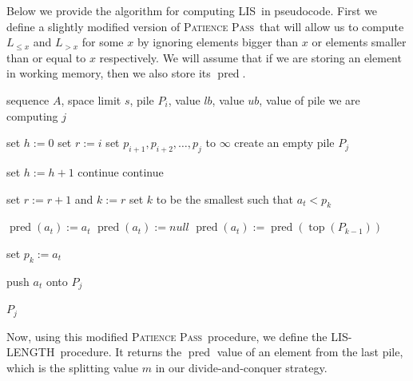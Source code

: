 \documentclass[lic, english, shortabstract]{iithesis}
\theoremstyle{plain}
\newcommand{\Lis}{\textsc{LIS}}
\newcommand{\LisLen}{\textsc{LIS-LENGTH}}
\newcommand{\Ppass}{\textsc{Patience Pass}}
\theoremstyle{definition}
\begin{document}
Below we provide the algorithm for computing \Lis\ in pseudocode.
First we define a slightly modified version of \Ppass\ that will allow us to compute $L_{\leq x}$ and $L_{> x}$ for some $x$ by ignoring elements bigger than $x$ or elements smaller than or equal to $x$ respectively.
We will assume that if we are storing an element in working memory, then we also store its $\operatorname{pred}$.
\begin{algorithm}
    \caption{\Ppass\ -- the second pass through an array, computing $P_j$}
    \label{alg:ppas-mod}
    \begin{algorithmic}[1]
        \Require sequence $A$, space limit $s$, pile $P_i$, value $lb$, value $ub$, value of pile we are computing $j$

        \State set $h := 0$ 
        \State set $r := i$
        \State set $p_{i+1}, p_{i+2}, \ldots, p_{j}$ to $\infty$ 
        \State create an empty pile $P_j$

                \State set $h := h + 1$ 
                \State continue
                \State continue
            \EndIf

                \State set $r := r + 1$ and $k := r$
            \Else
                \State set $k$ to be the smallest such that $a_t < p_k$
            \EndIf
            
                \State $\operatorname{pred}(a_t) := a_t$
                \State $\operatorname{pred}(a_t) := null$
            \Else 
                \State $\operatorname{pred}(a_t) := \operatorname{pred}(\operatorname{top}(P_{k-1}))$
            \EndIf

            \State set $p_k := a_t$

                \State push $a_t$ onto $P_j$
            \EndIf
        \EndFor

    \Return $P_j$
    \end{algorithmic}
\end{algorithm}

Now, using this modified \Ppass\ procedure, we define the \LisLen\ procedure. It returns the $\operatorname{pred}$ value of an element from the last pile, which is the splitting value $m$ in our divide-and-conquer strategy.
\end{document}
